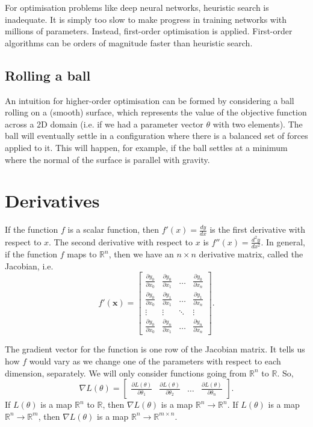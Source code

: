 \documentclass[a4paper, openany]{memoir}
\begin{document}
For optimisation problems like deep neural networks, heuristic search is inadequate. It is simply too slow to make progress in training networks with millions of parameters. Instead, first-order optimisation is applied. First-order algorithms can be orders of magnitude faster than heuristic search.

\subsection{Rolling a ball}
An intuition for higher-order optimisation can be formed by considering a ball rolling on a (smooth) surface, which represents the value of the objective function across a 2D domain (i.e. if we had a parameter vector $\theta$ with two elements). The ball will eventually settle in a configuration where there is a balanced set of forces applied to it. This will happen, for example, if the ball settles at a minimum where the normal of the surface is parallel with gravity.
\newpage

\section{Derivatives}
If the function $f$ is a scalar function, then $f'(x) = \frac{dy}{dx}$ is the first derivative with respect to $x$. The second derivative with respect to $x$ is $f''(x) = \frac{d^2 y}{dx^2}$. In general, if the function $f$ maps to $\mathbb{R}^n$, then we have an $n \times n$ derivative matrix, called the Jacobian, i.e.
\[f'(\mathbf{x}) = \begin{bmatrix}
    \frac{\partial y_0}{\partial x_0} & \frac{\partial y_0}{\partial x_1} & \dots & \frac{\partial y_0}{\partial x_n} \\
    \frac{\partial y_0}{\partial x_0} & \frac{\partial y_1}{\partial x_1} & \dots & \frac{\partial y_1}{\partial x_n} \\
    \vdots & \vdots & \ddots & \vdots \\
    \frac{\partial y_0}{\partial x_0} & \frac{\partial y_n}{\partial x_1} & \dots & \frac{\partial y_n}{\partial x_n} 
\end{bmatrix}.\]

The gradient vector for the function is one row of the Jacobian matrix. It tells us how $f$ would vary as we change one of the parameters with respect to each dimension, separately. We will only consider functions going from $\mathbb{R}^n$ to $\mathbb{R}$. So,
\[\nabla L(\theta) = \begin{bmatrix}
    \frac{\partial L(\theta)}{\partial \theta_1} & \frac{\partial L(\theta)}{\partial \theta_2} & \dots & \frac{\partial L(\theta)}{\partial \theta_n} 
\end{bmatrix}.\]
If $L(\theta)$ is a map $\mathbb{R}^n$ to $\mathbb{R}$, then $\nabla L(\theta)$ is a map $\mathbb{R}^n \to \mathbb{R}^n$. If $L(\theta)$ is a map $\mathbb{R}^n \to \mathbb{R}^m$, then $\nabla L(\theta)$ is a map $\mathbb{R}^n \to \mathbb{R}^{m \times n}$.
\end{document}

